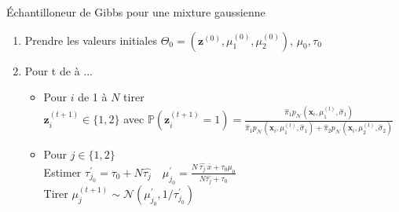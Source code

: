 \documentclass{presentation_template}
\begin{document}
    

\begin{frame}
    \small
    \begin{exampleblock}{\'Echantilloneur de Gibbs pour une mixture gaussienne}
    \begin{enumerate}
        \item Prendre les valeurs initiales $\Theta_0 = (\boldsymbol{z}^{(0)}, \mu_{1}^{(0)}, \mu_{2}^{(0)})$, $\mu_0, \tau_0$
        \item Pour t de  à ...
            \begin{itemize}
                \item Pour $i$ de 1 à $N$ tirer \\
                {\addtolength{\leftskip}{2cm} 
                    $\boldsymbol{z}_i^{(t+1)} \in \{1, 2 \}$ avec $\mathbb{P}(\boldsymbol{z}_i^{(t+1)}=1) = { \displaystyle \frac{
                    \hat{\pi}_{1}  p_{\mathcal{N}}(\boldsymbol{x}_i,\mu_{1}^{(t)}, \hat{\sigma}_{1})
                    }{
                        \hat{\pi}_{1}  p_{\mathcal{N}}(\boldsymbol{x}_i,\mu_{1}^{(t)}, \hat{\sigma}_{1})  +  
                        \hat{\pi}_{2}  p_{\mathcal{N}}(\boldsymbol{x}_i,\mu_{2}^{(t)}, \hat{\sigma}_{2})
                    }}$
                }
                \item Pour $j \in \{ 1,2\} $ \\
                Estimer 
                $\tau^{\prime}_{j_0} = \tau_0 + N \hat{\tau_j} \quad \displaystyle
                \mu_{j_0}^{\prime} = \frac{N\ \hat{\tau_j}\ \bar{x}+\tau_{0} \mu_{0}}{N \hat{\tau_j}+\tau_{0}} 
                $ \\
                Tirer $\mu_{j}^{(t+1)} \sim \mathcal{N}\left(\mu_{j_0}^{\prime}, 1 / \tau^{\prime}_{j_0}\right)$
            \end{itemize}
    \end{enumerate}
   
\end{exampleblock}
\end{frame}
\end{document}
